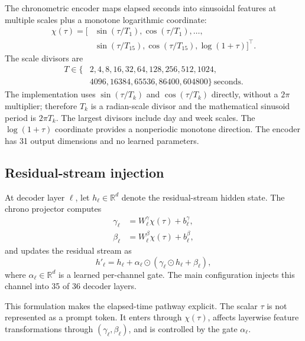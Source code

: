 \documentclass[conference,10pt]{IEEEtran}
\newcommand{\Tau}{\tau}
\begin{document}
The chronometric encoder maps elapsed seconds into sinusoidal features at multiple scales plus a monotone logarithmic coordinate:
\begin{equation}
\begin{aligned}
\chi(\Tau)=\big[&\sin(\Tau/T_1),\cos(\Tau/T_1),\ldots,\\
&\sin(\Tau/T_{15}),\cos(\Tau/T_{15}),\log(1+\Tau)\big]^\top .
\end{aligned}
\end{equation}
The scale divisors are
\begin{equation}
\begin{aligned}
T\in\{&2,4,8,16,32,64,128,256,512,1024,\nonumber\\
&4096,16384,65536,86400,604800\}\ \text{seconds}.
\end{aligned}
\end{equation}
The implementation uses $\sin(\Tau/T_k)$ and $\cos(\Tau/T_k)$ directly, without a $2\pi$ multiplier; therefore $T_k$ is a radian-scale divisor and the mathematical sinusoid period is $2\pi T_k$. The largest divisors include day and week scales. The $\log(1+\Tau)$ coordinate provides a nonperiodic monotone direction. The encoder has 31 output dimensions and no learned parameters.

\subsection{Residual-stream injection}

At decoder layer $\ell$, let $h_\ell\in\mathbb{R}^d$ denote the residual-stream hidden state. The chrono projector computes
\begin{align}
\gamma_\ell &= W^\gamma_\ell\chi(\Tau)+b^\gamma_\ell,\\
\beta_\ell &= W^\beta_\ell\chi(\Tau)+b^\beta_\ell,
\end{align}
and updates the residual stream as
\begin{equation}
 h'_\ell=h_\ell+\alpha_\ell\odot\left(\gamma_\ell\odot h_\ell+\beta_\ell\right),
\label{eq:film}
\end{equation}
where $\alpha_\ell\in\mathbb{R}^d$ is a learned per-channel gate. The main configuration injects this channel into 35 of 36 decoder layers.

This formulation makes the elapsed-time pathway explicit. The scalar $\Tau$ is not represented as a prompt token. It enters through $\chi(\Tau)$, affects layerwise feature transformations through $(\gamma_\ell,\beta_\ell)$, and is controlled by the gate $\alpha_\ell$.
\end{document}
